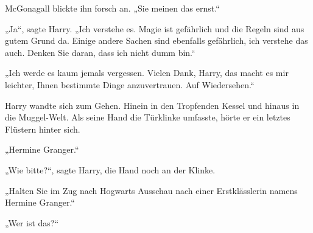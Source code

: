 McGonagall blickte ihn forsch an. „Sie meinen das ernst.“

„Ja“, sagte Harry. „Ich verstehe es. Magie ist gefährlich und die Regeln sind aus gutem Grund da. Einige andere Sachen sind ebenfalls gefährlich, ich verstehe das auch. Denken Sie daran, dass ich nicht dumm bin.“

„Ich werde es kaum jemals vergessen. Vielen Dank, Harry, das macht es mir leichter, Ihnen bestimmte Dinge anzuvertrauen. Auf Wiedersehen.“

Harry wandte sich zum Gehen. Hinein in den Tropfenden Kessel und hinaus in die Muggel-Welt. Als seine Hand die Türklinke umfasste, hörte er ein letztes Flüstern hinter sich.


„Hermine Granger.“

„Wie bitte?“, sagte Harry, die Hand noch an der Klinke.

„Halten Sie im Zug nach Hogwarts Ausschau nach einer Erstklässlerin namens Hermine Granger.“

„Wer ist das?“

